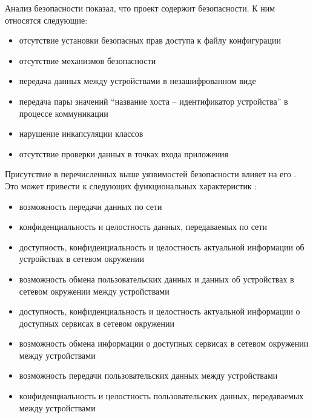 %
Анализ безопасности  показал, что проект содержит  безопасности. 
%
К ним относятся следующие:
\begin{itemize}
	\setlength{\itemsep}{0pt}%

	\item отсутствие установки безопасных прав доступа к файлу конфигурации
	\item отсутствие механизмов безопасности
	\item передача данных между устройствами в незашифрованном виде
	\item передача пары значений ``название хоста -- идентификатор устройства'' в процессе коммуникации
	\item нарушение инкапсуляции классов  
	\item отсутствие проверки данных в точках входа приложения
\end{itemize}

%
Присутствие в  перечисленных выше уязвимостей безопасности влияет на его . 
%
Это может привести к  следующих функциональных характеристик :
\begin{itemize}
	\setlength{\itemsep}{0pt}%

	\item возможность передачи данных по сети
	\item конфиденциальность и целостность данных, передаваемых по сети

	\item доступность, конфиденциальность и целостность актуальной информации об устройствах в сетевом окружении
	\item возможность обмена пользовательских данных и данных об устройствах в сетевом окружении между устройствами

	\item доступность, конфиденциальность и целостность актуальной информации о доступных сервисах в сетевом окружении
	\item возможность обмена информации о доступных сервисах в сетевом окружении между устройствами

	\item возможность передачи пользовательских данных между устройствами
	\item конфиденциальность и целостность пользовательских данных, передаваемых между устройствами
\end{itemize}

